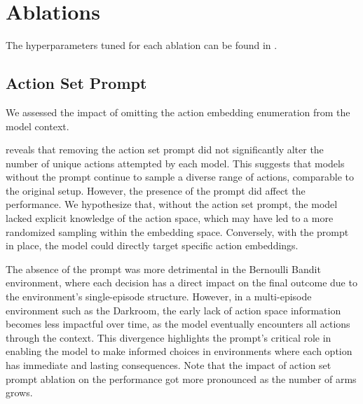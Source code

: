 \section{Ablations}
\label{section:ablations}



The hyperparameters tuned for each ablation can be found in .


\subsection{Action Set Prompt}
We assessed the impact of omitting the action embedding enumeration from the model context.


 reveals that removing the action set prompt did not significantly alter the number of unique actions attempted by each model. This suggests that models without the prompt continue to sample a diverse range of actions, comparable to the original setup. However, the presence of the prompt did affect the performance. We hypothesize that,
without the action set prompt, the model lacked explicit knowledge of the action space, which may have led to a more randomized sampling within the embedding space. Conversely, with the prompt in place, the model could directly target specific action embeddings.

The absence of the prompt was more detrimental in the Bernoulli Bandit environment, where each decision has a direct impact on the final outcome due to the environment's single-episode structure. However, in a multi-episode environment such as the Darkroom, the early lack of action space information becomes less impactful over time, as the model eventually encounters all actions through the context. This divergence highlights the prompt's critical role in enabling the model to make informed choices in environments where each option has immediate and lasting consequences. Note that the impact of action set prompt ablation on the performance got more pronounced as the number of arms grows.


